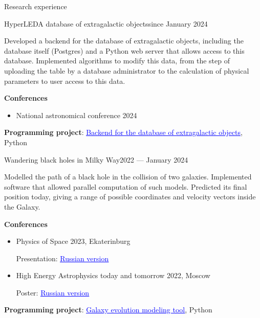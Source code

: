 \documentclass{resume} %
\newcommand{\link}[2]{\href{#1}{\textcolor{blue}{\underline{#2}}}}
\newcommand{\subheader}[2]{
	{\textbf{#1}} \ifthenelse{\equal{#2}{}}{}{\timestamp{#2}}
}
\begin{document}
	\begin{rSection}{Research experience}
		\begin{rSubsection}{HyperLEDA database of extragalactic objects}{since January 2024}{}{}{}
			\item Developed a backend for the database of extragalactic objects, including the database itself (Postgres) and a Python web server that allows access to this database. Implemented algorithms to modify this data, from the step of uploading the table by a database administrator to the calculation of physical parameters to user access to this data.
			\item \subheader{Conferences}{}
			\begin{itemize}
				\item National astronomical conference 2024 
			\end{itemize}
			\item \textbf{Programming project}: \link{https://github.com/HyperLEDA/db-app}{Backend for the database of extragalactic objects}, Python 
		\end{rSubsection}
		\begin{rSubsection}{Wandering black holes in Milky Way}{2022 --- January 2024}{}{}{}
			\item Modelled the path of a black hole in the collision of two galaxies. Implemented software that allowed parallel computation of such models. Predicted its final position today, giving a range of possible coordinates and velocity vectors inside the Galaxy.
			\item \subheader{Conferences}{}
			\begin{itemize}
				\item Physics of Space 2023, Ekaterinburg 
				
				Presentation: \link{https://www.overleaf.com/read/mnwwgvkqxdky}{Russian version}
				\item High Energy Astrophysics today and tomorrow 2022, Moscow 
				
				Poster: \link{https://www.overleaf.com/read/cwyptqpmdtdf}{Russian version}
			\end{itemize}

			\item \textbf{Programming project}: \link{https://github.com/Kraysent/OMTool}{Galaxy evolution modeling tool}, Python 
		\end{rSubsection}


\end{rSection}
\end{document}
